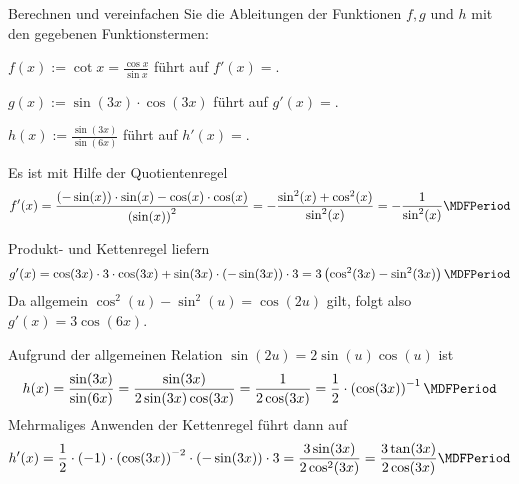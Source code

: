 \begin{MExercises}
\begin{MExercise}
Berechnen und vereinfachen Sie die Ableitungen der Funktionen $f,g$ und $h$ mit den gegebenen Funktionstermen:
\begin{MExerciseItems}
\item $f(x) := \cot x = \frac{\cos x}{\sin x}$
führt auf $f'(x) = $.
%
\item $g(x) := \sin(3 x) \cdot \cos(3 x)$
führt auf $g'(x) = $.
%
\item $h(x) := \frac{\sin(3 x)}{\sin(6 x)}$
führt auf $h'(x) = $.
\end{MExerciseItems}
\begin{MHint}{\iSolution}
 \begin{MExerciseItems}
  \item Es ist mit Hilfe der Quotientenregel
  \[
  f'(x) = \frac{(- \sin (x)) \cdot \sin (x) - \cos (x) \cdot \cos (x)}{\left( \sin (x) \right)^2}
  = - \frac{\sin^2 (x) + \cos^2 (x)}{\sin^2 (x)} = - \frac{1}{\sin^2 (x)} \MDFPeriod
  \]
  \item Produkt- und Kettenregel liefern
  \[
   g'(x) = \cos (3x) \cdot 3 \cdot \cos (3x) + \sin (3x) \cdot \left( - \sin (3x) \right) \cdot 3
   = 3 \left( \cos^2 (3x) - \sin^2 (3x) \right) \MDFPeriod
  \]
  Da allgemein $\cos^2 (u) - \sin^2 (u) = \cos (2u)$ gilt, folgt also $g'(x) = 3 \cos (6x)$.
  \item Aufgrund der allgemeinen Relation $\sin (2u) = 2 \sin(u) \cos(u)$ ist
  \[
  h(x) = \frac{\sin (3x)}{\sin (6x)} = \frac{\sin (3x)}{2 \sin (3x) \cos (3x)} = \frac{1}{2 \cos (3x)}
  = \frac12 \cdot \left( \cos (3x) \right)^{-1} \MDFPeriod
  \]
  Mehrmaliges Anwenden der Kettenregel führt dann auf
  \[
  h'(x) = \frac12 \cdot (-1) \cdot \left( \cos (3x) \right)^{-2} \cdot \left( - \sin (3x) \right) \cdot 3
  = \frac{3 \sin (3x)}{2 \cos^2 (3x)} = \frac{3 \tan (3x)}{2 \cos (3x)} \MDFPeriod
  \]
 \end{MExerciseItems}
\end{MHint}
\end{MExercise}


\end{MExercises}

